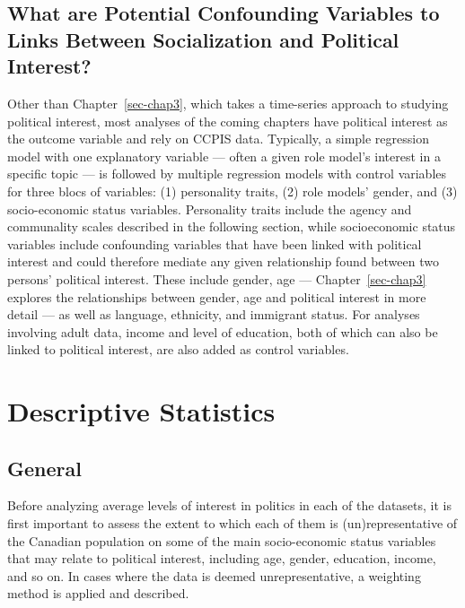 \documentclass[
  letterpaper,
  DIV=11,
  numbers=noendperiod]{scrreprt}
\begin{document}
\subsection{What are Potential Confounding Variables to Links Between
Socialization and Political
Interest?}\label{what-are-potential-confounding-variables-to-links-between-socialization-and-political-interest}

Other than Chapter~\ref{sec-chap3}, which takes a time-series approach
to studying political interest, most analyses of the coming chapters
have political interest as the outcome variable and rely on CCPIS data.
Typically, a simple regression model with one explanatory variable ---
often a given role model's interest in a specific topic --- is followed
by multiple regression models with control variables for three blocs of
variables: (1) personality traits, (2) role models' gender, and (3)
socio-economic status variables. Personality traits include the agency
and communality scales described in the following section, while
socioeconomic status variables include confounding variables that have
been linked with political interest and could therefore mediate any
given relationship found between two persons' political interest. These
include gender, age --- Chapter~\ref{sec-chap3} explores the
relationships between gender, age and political interest in more detail
--- as well as language, ethnicity, and immigrant status. For analyses
involving adult data, income and level of education, both of which can
also be linked to political interest, are also added as control
variables.

\section{Descriptive Statistics}\label{descriptive-statistics}

\subsection{General}\label{general}

Before analyzing average levels of interest in politics in each of the
datasets, it is first important to assess the extent to which each of
them is (un)representative of the Canadian population on some of the
main socio-economic status variables that may relate to political
interest, including age, gender, education, income, and so on. In cases
where the data is deemed unrepresentative, a weighting method is applied
and described.
\end{document}
